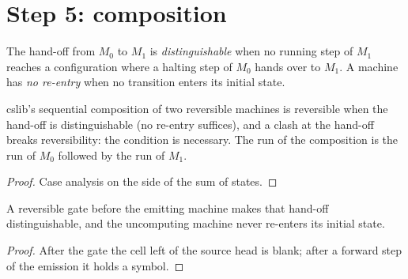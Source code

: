 \section{Step 5: composition}

\begin{definition}
  \label{def:handoff}
  \leanok
  The hand-off from $M_0$ to $M_1$ is \emph{distinguishable} when no running step of $M_1$ reaches a
  configuration where a halting step of $M_0$ hands over to $M_1$. A machine has \emph{no re-entry}
  when no transition enters its initial state.
  \own{}
\end{definition}

\begin{theorem}
  \label{thm:seq-reversible}
  \leanok
  cslib's sequential composition of two reversible machines is reversible when the hand-off is
  distinguishable (no re-entry suffices), and a clash at the hand-off breaks reversibility: the
  condition is necessary. The run of the composition is the run of $M_0$ followed by the run of
  $M_1$.
\end{theorem}

\begin{proof}
  \leanok
  Case analysis on the side of the sum of states.
\end{proof}

\begin{lemma}
  \label{lem:gate}
  \leanok
  A reversible gate before the emitting machine makes that hand-off distinguishable, and the
  uncomputing machine never re-enters its initial state.
\end{lemma}

\begin{proof}
  \leanok
  After the gate the cell left of the source head is blank; after a forward step of the emission it
  holds a symbol.
\end{proof}

